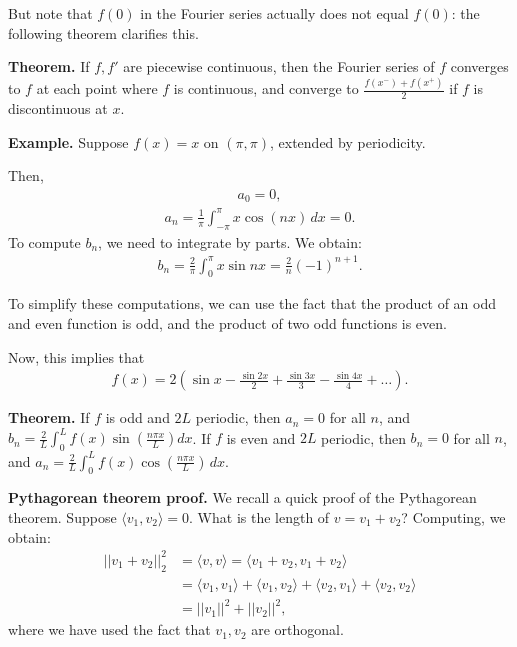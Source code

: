\documentclass{article}
\begin{document}
But note that $f(0)$ in the Fourier series actually does not equal $f(0)$: the following theorem clarifies this.

{\bf Theorem.}  If $f, f'$ are piecewise continuous, then the Fourier series of $f$ converges to $f$ at each point where $f$ is continuous, and converge to $\frac{f(x^{-}) + f(x^{+})}{2}$ if $f$ is discontinuous at $x$.

{\bf Example.} Suppose $f(x) = x$ on $(\pi, \pi)$, extended by periodicity.

Then,
\begin{align*}
  a_0 = 0,
\end{align*}
\begin{align*}
  a_n = \frac{1}{\pi} \int_{- \pi}^{\pi} x \cos (n x)  \, dx = 0.
\end{align*}
To compute $b_n$, we need to integrate by parts.  We obtain:
\begin{align*}
  b_n = \frac{2}{\pi} \int_{0}^{\pi} x \sin nx = \frac{2}{n} (-1)^{n+1}.
\end{align*}

To simplify these computations, we can use the fact that the product of an odd and even function is odd, and the product of two odd functions is even.

Now, this implies that
\begin{align*}
  f(x) = 2 \left( \sin x - \frac{\sin 2x}{2} + \frac{\sin 3x}{3} - \frac{\sin 4x}{4} + \dots \right).
\end{align*}

{\bf Theorem.} If $f$ is odd and $2L$ periodic, then $a_n = 0$ for all $n$, and $b_n = \frac{2}{L} \int_{0}^{L} f(x) \sin \left( \frac{n \pi x}{L}  \right) dx$.  If $f$ is even and $2L$ periodic, then $b_n = 0$ for all $n$, and $a_n = \frac{2}{L} \int_{0}^{L} f(x) \cos \left( \frac{n \pi x}{L} \right) \, dx$.

{\bf Pythagorean theorem proof.} We recall a quick proof of the Pythagorean theorem.  Suppose $\langle v_1, v_2\rangle = 0$.  What is the length of $v = v_1 + v_2$?  Computing, we obtain:
\begin{align*}
  ||v_1 + v_2||_2^2 &= \langle v, v \rangle = \langle v_1 + v_2, v_1 + v_2 \rangle \\
  &= \langle v_1, v_1\rangle + \langle v_1, v_2\rangle + \langle v_2, v_1\rangle + \langle v_2, v_2\rangle \\
  &= ||v_1||^2 + ||v_2||^2,
\end{align*} 
where we have used the fact that $v_1, v_2$ are orthogonal.
\end{document}
